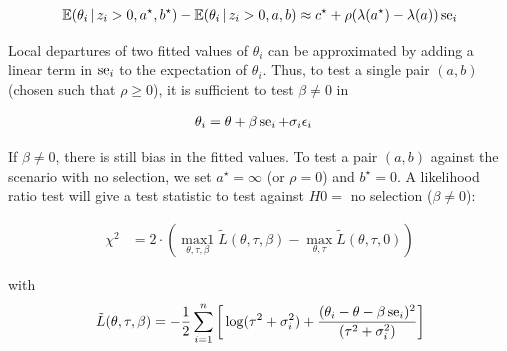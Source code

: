\documentclass[11pt,a4paper,twoside]{book}\usepackage[]{graphicx}\usepackage[]{color}
\begin{document}
\begin{align}
\mathbb{E}(\theta_i\,\vert\, z_i > 0, a^\star, b^\star) - \mathbb{E}(\theta_i\,\vert\, z_i > 0, a, b) \approx c^\star + \rho(\lambda(a^\star) - \lambda(a))\operatorname{se}_i \nonumber
\end{align}

Local departures of two fitted values of $\theta_i$ can be approximated by adding a linear term in $\operatorname{se}_i$ to the expectation of $\theta_i$. Thus, to test a single pair $(a,b)$ (chosen such that $\rho \geq 0$), it is sufficient to test $\beta \neq 0$ in

\begin{align}
\theta_i &= \theta + \beta \operatorname{se}_i + \sigma_i \epsilon_i \nonumber
\end{align}

If $\beta \neq 0$, there is still bias in the fitted values. To test a pair $(a,b)$ against the scenario with no selection, we set $a^\star = \infty$ (or $\rho = 0$) and $b^\star = 0$. A likelihood ratio test will give a test statistic to test against $H0 =$ no selection ($\beta \neq 0$):

\begin{align}
\chi^2 &= 2\cdot(\operatorname*{max1}_{\theta, \tau, \beta}\tilde{L}(\theta, \tau, \beta) - \operatorname*{max}_{\theta, \tau}\tilde{L}(\theta, \tau, 0)) \label{eq:copas.small.study}
\end{align}

with 
\begin{align}
\tilde{L}(\theta, \tau, \beta) = -\frac{1}{2}\sum_{i = 1}^n\bigg[\log(\tau^2 + \sigma_i^2) + \frac{(\theta_i - \theta - \beta \operatorname{se}_i)^2}{(\tau^2 + \sigma_i^2)}\bigg] \nonumber
\end{align}
\end{document}
